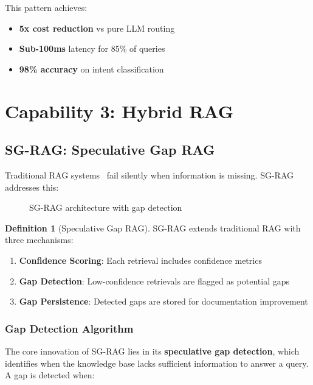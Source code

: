 \documentclass[11pt,a4paper]{article}
\theoremstyle{definition}
\newtheorem{definition}{Definition}[section]
\theoremstyle{remark}
\newcommand{\sgrag}{\textsc{SG-RAG}\xspace}
\begin{document}
This pattern achieves:
\begin{itemize}
    \item \textbf{5x cost reduction} vs pure LLM routing
    \item \textbf{Sub-100ms} latency for 85\% of queries
    \item \textbf{98\% accuracy} on intent classification
\end{itemize}

\section{Capability 3: Hybrid RAG}
\label{sec:rag}

\subsection{SG-RAG: Speculative Gap RAG}

Traditional RAG systems~\cite{lewis2020retrieval,gao2023retrieval} fail silently when information is missing. \sgrag addresses this:

\begin{figure}[H]
    \centering
    
    \caption{\sgrag architecture with gap detection}
    \label{fig:sgrag}
\end{figure}

\begin{definition}[Speculative Gap RAG]
\sgrag extends traditional RAG with three mechanisms:
\begin{enumerate}
    \item \textbf{Confidence Scoring}: Each retrieval includes confidence metrics
    \item \textbf{Gap Detection}: Low-confidence retrievals are flagged as potential gaps
    \item \textbf{Gap Persistence}: Detected gaps are stored for documentation improvement
\end{enumerate}
\end{definition}

\subsubsection{Gap Detection Algorithm}

The core innovation of \sgrag lies in its \textbf{speculative gap detection}, which identifies when the knowledge base lacks sufficient information to answer a query. A gap is detected when:
\end{document}
